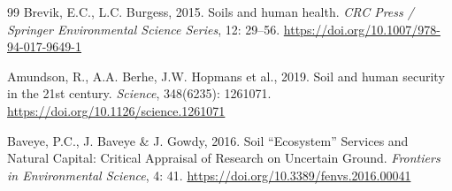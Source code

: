 \documentclass[sn-mathphys-num]{sn-jnl}
\begin{document}
\begin{thebibliography}{99}
Brevik, E.C., L.C. Burgess, 2015.
Soils and human health.
\textit{CRC Press / Springer Environmental Science Series}, 12: 29--56.
\url{https://doi.org/10.1007/978-94-017-9649-1}

Amundson, R., A.A. Berhe, J.W. Hopmans et al., 2019.
Soil and human security in the 21st century.
\textit{Science}, 348(6235): 1261071.
\url{https://doi.org/10.1126/science.1261071}

Baveye, P.C., J. Baveye \& J. Gowdy, 2016.
Soil ``Ecosystem'' Services and Natural Capital: Critical Appraisal of Research 
on Uncertain Ground.
\textit{Frontiers in Environmental Science}, 4: 41.
\url{https://doi.org/10.3389/fenvs.2016.00041}

\end{thebibliography}
\end{document}
